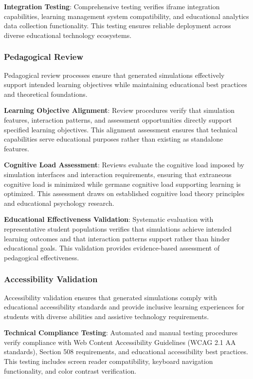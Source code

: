 \textbf{Integration Testing}: Comprehensive testing verifies iframe integration capabilities, learning management system compatibility, and educational analytics data collection functionality. This testing ensures reliable deployment across diverse educational technology ecosystems.

\subsubsection{Pedagogical Review}

Pedagogical review processes ensure that generated simulations effectively support intended learning objectives while maintaining educational best practices and theoretical foundations.

\textbf{Learning Objective Alignment}: Review procedures verify that simulation features, interaction patterns, and assessment opportunities directly support specified learning objectives. This alignment assessment ensures that technical capabilities serve educational purposes rather than existing as standalone features.

\textbf{Cognitive Load Assessment}: Reviews evaluate the cognitive load imposed by simulation interfaces and interaction requirements, ensuring that extraneous cognitive load is minimized while germane cognitive load supporting learning is optimized. This assessment draws on established cognitive load theory principles and educational psychology research.

\textbf{Educational Effectiveness Validation}: Systematic evaluation with representative student populations verifies that simulations achieve intended learning outcomes and that interaction patterns support rather than hinder educational goals. This validation provides evidence-based assessment of pedagogical effectiveness.

\subsubsection{Accessibility Validation}

Accessibility validation ensures that generated simulations comply with educational accessibility standards and provide inclusive learning experiences for students with diverse abilities and assistive technology requirements.

\textbf{Technical Compliance Testing}: Automated and manual testing procedures verify compliance with Web Content Accessibility Guidelines (WCAG 2.1 AA standards), Section 508 requirements, and educational accessibility best practices. This testing includes screen reader compatibility, keyboard navigation functionality, and color contrast verification.

